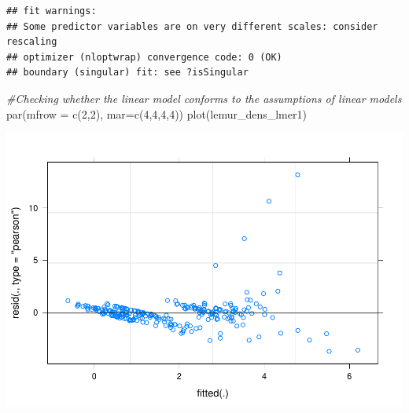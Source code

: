 \documentclass[
  12pt,
]{article}
\newenvironment{Shaded}{\begin{snugshade}}{\end{snugshade}}
\newcommand{\AttributeTok}[1]{\textcolor[rgb]{0.77,0.63,0.00}{#1}}
\newcommand{\CommentTok}[1]{\textcolor[rgb]{0.56,0.35,0.01}{\textit{#1}}}
\newcommand{\DecValTok}[1]{\textcolor[rgb]{0.00,0.00,0.81}{#1}}
\newcommand{\FunctionTok}[1]{\textcolor[rgb]{0.00,0.00,0.00}{#1}}
\newcommand{\NormalTok}[1]{#1}
\newcommand{\SpecialCharTok}[1]{\textcolor[rgb]{0.00,0.00,0.00}{#1}}
\begin{document}
\begin{verbatim}
## fit warnings:
## Some predictor variables are on very different scales: consider rescaling
## optimizer (nloptwrap) convergence code: 0 (OK)
## boundary (singular) fit: see ?isSingular
\end{verbatim}

\begin{Shaded}
\begin{Highlighting}[]
\CommentTok{\#Checking whether the linear model conforms to the assumptions of linear models}
\FunctionTok{par}\NormalTok{(}\AttributeTok{mfrow =} \FunctionTok{c}\NormalTok{(}\DecValTok{2}\NormalTok{,}\DecValTok{2}\NormalTok{), }\AttributeTok{mar=}\FunctionTok{c}\NormalTok{(}\DecValTok{4}\NormalTok{,}\DecValTok{4}\NormalTok{,}\DecValTok{4}\NormalTok{,}\DecValTok{4}\NormalTok{))}
\FunctionTok{plot}\NormalTok{(lemur\_dens\_lmer1)}
\end{Highlighting}
\end{Shaded}

\includegraphics{project_draft_files/figure-latex/unnamed-chunk-5-4.pdf}

\begin{Shaded}
\end{Shaded}
\end{document}
